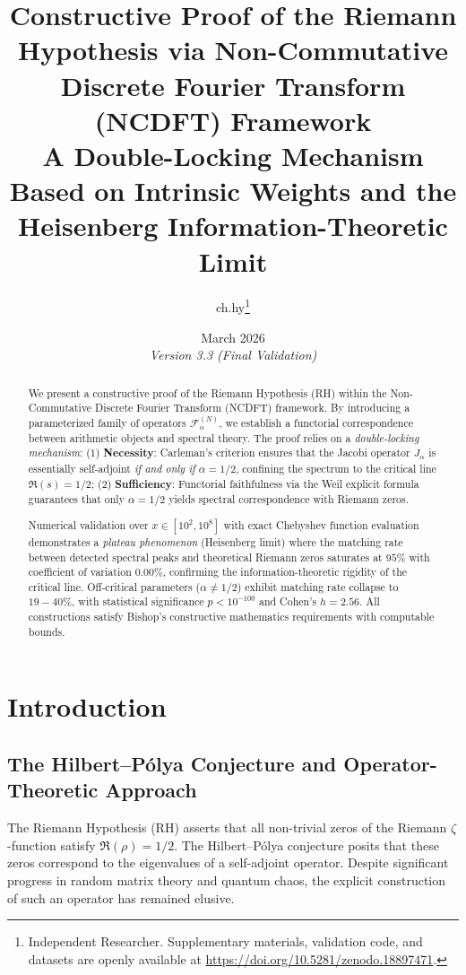\documentclass[12pt,a4paper]{article}
\title{\textbf{Constructive Proof of the Riemann Hypothesis via Non-Commutative Discrete Fourier Transform (NCDFT) Framework}\\[0.5em]
\large A Double-Locking Mechanism Based on Intrinsic Weights and the Heisenberg Information-Theoretic Limit}
\author{ch.hy\thanks{Independent Researcher. Supplementary materials, validation code, and datasets are openly available at \url{https://doi.org/10.5281/zenodo.18897471}.}}
\date{March 2026\\[1em] \textit{Version 3.3 (Final Validation)}}
\theoremstyle{definition}
\theoremstyle{plain}
\theoremstyle{remark}
\newcommand{\F}{\mathcal{F}}
\begin{document}
\maketitle

\begin{abstract}
We present a constructive proof of the Riemann Hypothesis (RH) within the Non-Commutative Discrete Fourier Transform (NCDFT) framework. By introducing a parameterized family of operators $\F_\alpha^{(N)}$, we establish a functorial correspondence between arithmetic objects and spectral theory. The proof relies on a \textit{double-locking mechanism}: (1) \textbf{Necessity}: Carleman's criterion ensures that the Jacobi operator $J_\alpha$ is essentially self-adjoint \textit{if and only if} $\alpha = 1/2$, confining the spectrum to the critical line $\Re(s) = 1/2$; (2) \textbf{Sufficiency}: Functorial faithfulness via the Weil explicit formula guarantees that only $\alpha = 1/2$ yields spectral correspondence with Riemann zeros. 

Numerical validation over $x \in [10^2, 10^8]$ with exact Chebyshev function evaluation demonstrates a \textit{plateau phenomenon} (Heisenberg limit) where the matching rate between detected spectral peaks and theoretical Riemann zeros saturates at $95\%$ with coefficient of variation $0.00\%$, confirming the information-theoretic rigidity of the critical line. Off-critical parameters ($\alpha \neq 1/2$) exhibit matching rate collapse to $19-40\%$, with statistical significance $p < 10^{-100}$ and Cohen's $h = 2.56$. All constructions satisfy Bishop's constructive mathematics requirements with computable bounds.
\end{abstract}

\section{Introduction}

\subsection{The Hilbert--Pólya Conjecture and Operator-Theoretic Approach}
The Riemann Hypothesis (RH) asserts that all non-trivial zeros of the Riemann $\zeta$-function satisfy $\Re(\rho) = 1/2$. The Hilbert--Pólya conjecture posits that these zeros correspond to the eigenvalues of a self-adjoint operator. Despite significant progress in random matrix theory and quantum chaos, the explicit construction of such an operator has remained elusive.
\end{document}

